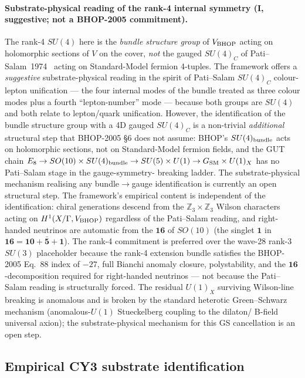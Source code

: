 ﻿\documentclass[reprint,amsmath,amssymb,aps,prd,longbibliography,floatfix]{revtex4-2}
\begin{document}
\paragraph{Substrate-physical reading of the rank-4 internal symmetry
\textmd{(I, suggestive; not a BHOP-2005 commitment)}.}
The rank-4 $SU(4)$ here is the \emph{bundle structure group} of
$V_{\rm BHOP}$ acting on holomorphic sections of $V$ on the cover,
\emph{not} the gauged $SU(4)_C$ of Pati--Salam~1974~\cite{PatiSalam1974}
acting on Standard-Model fermion 4-tuples. The framework offers a
\emph{suggestive} substrate-physical reading in the spirit of
Pati--Salam $SU(4)_C$ colour-lepton unification --- the four internal
modes of the bundle treated as three colour modes plus a fourth
``lepton-number'' mode --- because both groups are $SU(4)$ and both
relate to lepton/quark unification. However, the identification of
the bundle structure group with a 4D gauged $SU(4)_C$ is a non-trivial
\emph{additional} structural step that BHOP-2005 \S 6 does not
assume: BHOP's $SU(4)_{\rm bundle}$ acts on holomorphic sections,
not on Standard-Model fermion fields, and the GUT chain
$E_8 \to SO(10) \times SU(4)_{\rm bundle} \to SU(5) \times U(1) \to
G_{\rm SM} \times U(1)_X$ has no Pati--Salam stage in the gauge-symmetry-
breaking ladder. The substrate-physical mechanism realising any
bundle$\to$gauge identification is currently an open structural
step. The framework's empirical content is independent of the
identification: chiral generations descend from the
$\mathbb{Z}_3 \times \mathbb{Z}_3$ Wilson characters acting on
$H^1(X/\Gamma, V_{\rm BHOP})$ regardless of the Pati--Salam reading,
and right-handed neutrinos are automatic from the $\mathbf{16}$ of
$SO(10)$ (the singlet $\mathbf{1}$ in
$\mathbf{16} = \mathbf{10} + \bar{\mathbf{5}} + \mathbf{1}$). The
rank-4 commitment is preferred over the wave-28 rank-3 $SU(3)$
placeholder because the rank-4 extension bundle satisfies the BHOP-2005
Eq.~88 index of $-27$, full Bianchi anomaly closure, polystability,
and the $\mathbf{16}$-decomposition required for right-handed
neutrinos --- not because the Pati--Salam reading is structurally
forced. The residual $U(1)_X$ surviving Wilson-line breaking is
anomalous and is broken by the standard heterotic Green--Schwarz
mechanism (anomalous-$U(1)$ Stueckelberg coupling to the dilaton/
B-field universal axion); the substrate-physical mechanism for
this GS cancellation is an open step.

\subsection{Empirical CY3 substrate identification}
\label{sec:cy3-substrate-identification}
\end{document}
